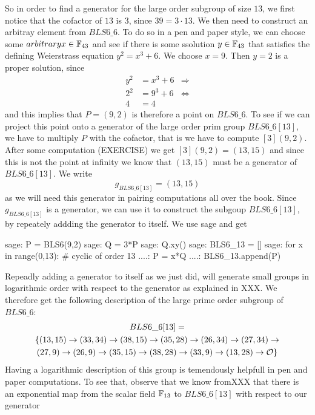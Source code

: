 So in order to find a generator for the large order subgroup of size $13$, we first notice that the cofactor of $13$ is $3$, since $39=3\cdot 13$. We then need to construct an arbitray element from $BLS6\_6$. To do so in a pen and paper style, we can choose some $arbitrary x\in\mathbb{F}_{43}$ and see if there is some ssolution $y\in\mathbb{F}_{43}$ that satisfies the defining Weierstrass equation $y^2 = x^3 + 6$. We choose $x=9$. Then $y=2$ is a proper solution, since
\begin{align*}
y^2 & = x^3 + 6 & \Rightarrow \\
2^2 & = 9^3 + 6 & \Leftrightarrow \\
4 & = 4
\end{align*}
and this implies that $P=(9,2)$ is therefore a point on $BLS6\_6$. To see if we can project this point onto a generator of the large order prim group $BLS6\_6[13]$, we have to multiply $P$ with the cofactor, that is we have to compute $[3](9,2)$. After some computation (EXERCISE) we get $[3](9,2) = (13,15)$ and since this is not the point at infinity we know that $(13,15)$ must be a generator of $BLS6\_6[13]$. We write
\begin{equation}
g_{BLS6\_6[13]} = (13,15)
\end{equation}
as we will need this generator in pairing computations all over the book. Since $g_{BLS6\_6[13]}$ is a generator, we can use it to construct the subgoup $BLS6\_6[13]$, by repeately addding the generator to itself. We use sage and get
\begin{sagecommandline}
sage: P = BLS6(9,2)
sage: Q = 3*P
sage: Q.xy()
sage: BLS6_13 = []
sage: for x in range(0,13): # cyclic of order 13
....:     P = x*Q
....:     BLS6_13.append(P)
\end{sagecommandline}
Repeadly adding a generator to itself as we just did, will generate small groups in logarithmic order with respect to the generator as explained in XXX. We therefore get the following description of the large prime order subgroup of $BLS6\_6$:
\begin{multline}
BLS6\_6[13]=\\
\{(13,15) \rightarrow (33,34) \rightarrow  (38,15) \rightarrow  (35,28) \rightarrow (26,34) \rightarrow  (27,34) \rightarrow  \\
(27,9)  \rightarrow  (26,9) \rightarrow  (35,15) \rightarrow  (38,28) \rightarrow  (33,9) \rightarrow (13,28) \rightarrow  \mathcal{O}\}$$
\end{multline}
Having a logarithmic description of this group is temendously helpfull in pen and paper computations. To see that, observe that we know fromXXX that there is an exponential map from the scalar field $\mathbb{F}_{13}$ to $BLS6\_6[13]$ with respect to our generator
